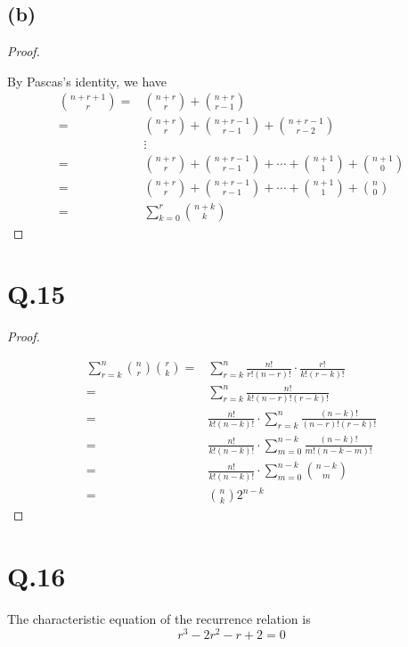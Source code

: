 \documentclass[a4paper,12pt]{article}
\begin{document}
\subsection*{(b)}

\begin{proof}
$ $

By Pascas's identity, we have
\begin{align*}
	\binom{n + r + 1}{r} =& \binom{n + r}{r} + \binom{n + r}{r - 1} \\
	=& \binom{n + r}{r} + \binom{n + r - 1}{r - 1} + \binom{n + r - 1}{r - 2} \\
	&\vdots \\
	=& \binom{n + r}{r} + \binom{n + r - 1}{r - 1} + \cdots + \binom{n + 1}{1} + \binom{n + 1}{0} \\
	=&\binom{n + r}{r} + \binom{n + r - 1}{r - 1} + \cdots + \binom{n + 1}{1} + \binom{n}{0} \\
	=& \sum_{k = 0}^r \binom{n + k}{k}
\end{align*}
\end{proof}

\section*{Q.15}

\begin{proof}
$ $

\begin{align*}
	\sum_{r=k}^n \binom{n}{r} \binom{r}{k} =& \sum_{r=k}^n \frac{n!}{r!(n - r)!} \cdot \frac{r!}{k!(r - k)!} \\
	=& \sum_{r=k}^n \frac{n!}{k!(n - r)!(r - k)!} \\
	=& \frac{n!}{k!(n-k)!} \cdot \sum_{r=k}^n \frac{(n - k)!}{(n - r)!(r - k)!} \\
	=& \frac{n!}{k!(n-k)!} \cdot \sum_{m=0}^{n-k} \frac{(n - k)!}{m!(n - k - m)!} \\
	=& \frac{n!}{k!(n-k)!} \cdot \sum_{m=0}^{n-k} \binom{n - k}{m} \\
	=& \binom{n}{k} 2^{n - k}
\end{align*}
\end{proof}

\section*{Q.16}

The characteristic equation of the recurrence relation is
\begin{equation*}
	r^3 - 2r^2 - r + 2 = 0
\end{equation*}
\end{document}
